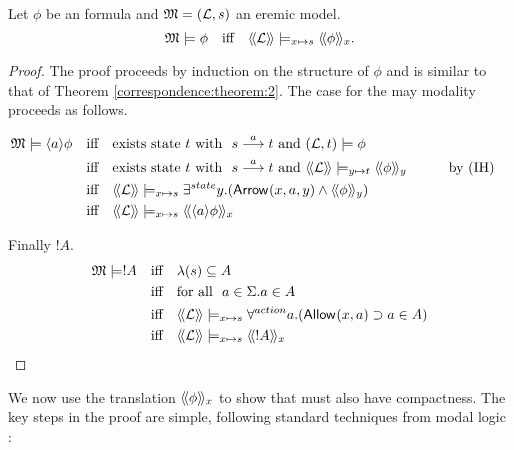 \begin{theorem}\label{correspondence:theorem:2}
Let $\phi$ be an \ELABR{} formula and $\frak{M} = (\mathcal{L}, s)$ an eremic
model.
\[
   \frak{M} \models \phi \quad  \text{iff} \quad \langle\!\langle \mathcal{L} \rangle\!\rangle \models_{x \mapsto s} \langle\!\langle \phi \rangle\!\rangle_x.
\]
\end{theorem}
\begin{proof}
The proof proceeds by induction on the structure of $\phi$ and is
similar to that of Theorem \ref{correspondence:theorem:2}.
The case for the may modality proceeds as follows.  

\begin{alignat*}{2}
  \MMM \models \MAY{a}\phi
     &\quad\text{iff}\quad 
  \text{exists state $t$ with }\ s \TRANS{a} t\ \text{and}\ (\LLL, t) \models \phi \\
     &\quad\text{iff}\quad
  \text{exists state $t$ with }\ s \TRANS{a} t\ \text{and}\ \SEMBTWO{\LLL} \models_{y \mapsto t} \SEMBTWO{\phi}_y &\qquad& \text{by (IH)}\\
     &\quad\text{iff}\quad
  \SEMBTWO{\LLL} \models_{x \mapsto s} \exists^{state} y.(\ARROWTWO{}{x}{a}{y} \AND \SEMBTWO{\phi}_y) \\
     &\quad\text{iff}\quad
   \SEMBTWO{\LLL} \models_{x \mapsto s} \SEMBTWO{\MAY{a}{\phi}}_x
\end{alignat*}

Finally $!A$.
\begin{alignat*}{2}
  \frak{M} \models !A
     &\quad\text{iff}\quad
  \lambda (s) \subseteq A \\
      &\quad\text{iff}\quad
  \text{for all }\ a \in \Sigma. a \in A \\
     &\quad\text{iff}\quad
  \langle\!\langle \mathcal{L} \rangle\!\rangle \models_{x \mapsto s} \forall^{action} a. (\mathsf{Allow}^{}(x, a) \supset a \in A) \\
     &\quad\text{iff}\quad
  \langle\!\langle \mathcal{L} \rangle\!\rangle \models_{x \mapsto s} \langle\!\langle !A \rangle\!\rangle_x
\end{alignat*}

\end{proof}

\NI We now use the translation $\langle\!\langle \phi \rangle\!\rangle_x$ to show that \ELABR{} must also have compactness. The key steps in the proof are
simple, following standard techniques from modal logic
\cite{BlackburnP:modlog}:

